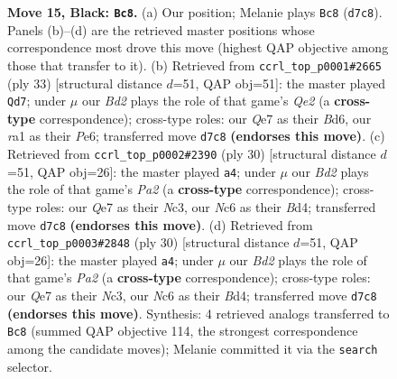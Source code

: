 \documentclass[11pt]{article}
\begin{document}
\begin{figure}[p]
\caption{\textbf{Move 15, Black: \texttt{Bc8}.} (a) Our position; Melanie plays \texttt{Bc8} (\texttt{d7c8}). Panels (b)--(d) are the retrieved master positions whose correspondence most drove this move (highest QAP objective among those that transfer to it). (b) Retrieved from \texttt{ccrl\_top\_p0001\#2665} (ply 33) [structural distance $d$=51, QAP obj=51]: the master played \texttt{Qd7}; under $\mu$ our \emph{Bd2} plays the role of that game's \emph{Qe2} (a \textbf{cross-type} correspondence); cross-type roles: our \emph{Q}e7 as their \emph{B}d6, our \emph{r}a1 as their \emph{P}e6; transferred move \texttt{d7c8} \textbf{(endorses this move)}. (c) Retrieved from \texttt{ccrl\_top\_p0002\#2390} (ply 30) [structural distance $d$=51, QAP obj=26]: the master played \texttt{a4}; under $\mu$ our \emph{Bd2} plays the role of that game's \emph{Pa2} (a \textbf{cross-type} correspondence); cross-type roles: our \emph{Q}e7 as their \emph{N}c3, our \emph{N}c6 as their \emph{B}d4; transferred move \texttt{d7c8} \textbf{(endorses this move)}. (d) Retrieved from \texttt{ccrl\_top\_p0003\#2848} (ply 30) [structural distance $d$=51, QAP obj=26]: the master played \texttt{a4}; under $\mu$ our \emph{Bd2} plays the role of that game's \emph{Pa2} (a \textbf{cross-type} correspondence); cross-type roles: our \emph{Q}e7 as their \emph{N}c3, our \emph{N}c6 as their \emph{B}d4; transferred move \texttt{d7c8} \textbf{(endorses this move)}. Synthesis: 4 retrieved analogs transferred to \texttt{Bc8} (summed QAP objective 114, the strongest correspondence among the candidate moves); Melanie committed it via the \texttt{search} selector.}
\label{fig:thought-m29}
\end{figure}

\clearpage
\end{document}
